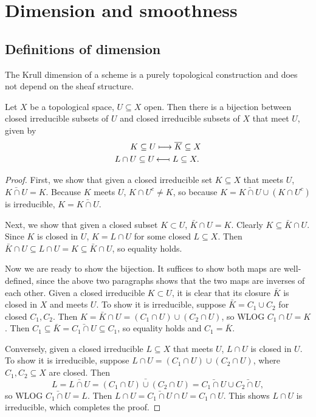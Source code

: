 \documentclass[11pt]{amsart}
\begin{document}
\section{Dimension and smoothness}


\subsection{Definitions of dimension}

The Krull dimension of a scheme is a purely topological construction and does not depend on the sheaf structure. 

\begin{lem}
    Let $X$ be a topological space, $U\subseteq X$ open. Then there is a bijection between closed irreducible subsets of $U$ and closed irreducible subsets of $X$ that meet $U$, given by
    \begin{align*}
        K \subseteq U &\longmapsto \bar{K} \subseteq X \\
        L\cap U\subseteq U \thinspace & \text{\reflectbox{$\longmapsto$}}\ L\subseteq X.
    \end{align*}
\end{lem}

\begin{proof}
First, we show that given a closed irreducible set $K\subseteq X$ that meets $U$, $\bar{K\cap U} = K$. Because $K$ meets $U$, $K\cap U^{c} \neq K$, so because $K = \bar{K\cap U} \cup (K\cap U^c)$ is irreducible, $K = \bar{K\cap U}$.

Next, we show that given a closed subset $K\subset U$, $\bar{K}\cap U = K$. Clearly $K\subseteq \bar{K}\cap U$. Since $K$ is closed in $U$, $K = L\cap U$ for some closed $L\subseteq X$. Then $\bar{K}\cap U \subseteq L\cap U = K\subseteq \bar{K}\cap U$, so equality holds.

Now we are ready to show the bijection. It suffices to show both maps are well-defined, since the above two paragraphs shows that the two maps are inverses of each other. Given a closed irreducible $K\subset U$, it is clear that its closure $\bar{K}$ is closed in $X$ and meets $U$. To show it is irreducible, suppose $\bar{K} = C_1\cup C_2$ for closed $C_1,C_2$. Then $K = \bar{K}\cap U = (C_1\cap U)\cup (C_2\cap U)$, so WLOG $C_1\cap U = K$. Then $C_1\subseteq \bar{K} = \bar{C_1\cap U}\subseteq C_1$, so equality holds and $C_1 = \bar{K}$. 

Conversely, given a closed irreducible $L\subseteq X$ that meets $U$, $L\cap U$ is closed in $U$. To show it is irreducible, suppose $L\cap U = (C_1\cap U)\cup (C_2\cap U)$, where $C_1,C_2\subseteq X$ are closed. Then 
\[L = \bar{L\cap U} = \bar{(C_1\cap U)\cup (C_2\cap U)} = \bar{C_1\cap U} \cup \bar{C_2\cap U},\]
so WLOG $\bar{C_1\cap U} = L$. Then $L\cap U = \bar{C_1\cap U} \cap U = C_1\cap U$. This shows $L\cap U$ is irreducible, which completes the proof.
\end{proof}
\end{document}
